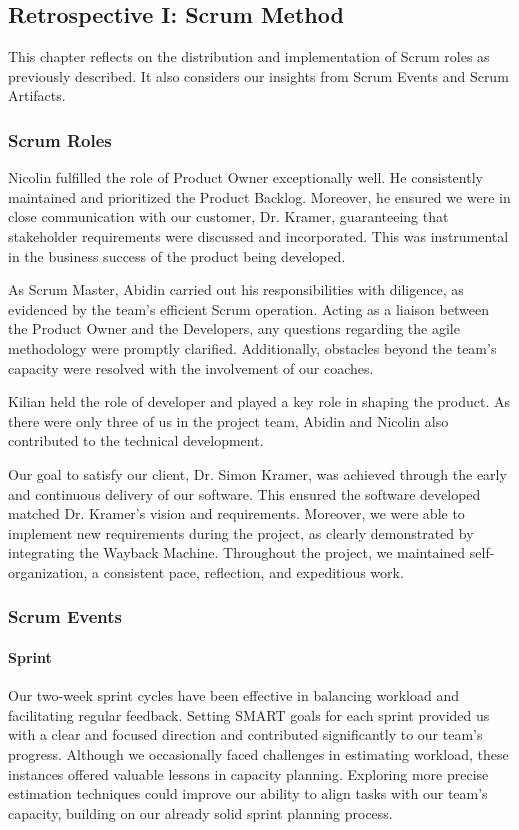 \subsection{Retrospective I: Scrum Method}
This chapter reflects on the distribution and implementation of Scrum roles as previously described.
It also considers our insights from Scrum Events and Scrum Artifacts.

\subsubsection{Scrum Roles}
Nicolin fulfilled the role of Product Owner exceptionally well.
He consistently maintained and prioritized the Product Backlog.
Moreover, he ensured we were in close communication with our customer, Dr. Kramer, guaranteeing that stakeholder requirements were discussed and incorporated.
This was instrumental in the business success of the product being developed.

As Scrum Master, Abidin carried out his responsibilities with diligence, as evidenced by the team's efficient Scrum operation.
Acting as a liaison between the Product Owner and the Developers, any questions regarding the agile methodology were promptly clarified.
Additionally, obstacles beyond the team's capacity were resolved with the involvement of our coaches.

Kilian held the role of developer and played a key role in shaping the product.
As there were only three of us in the project team, Abidin and Nicolin also contributed to the technical development.

Our goal to satisfy our client, Dr. Simon Kramer, was achieved through the early and continuous delivery of our software.
This ensured the software developed matched Dr. Kramer's vision and requirements.
Moreover, we were able to implement new requirements during the project, as clearly demonstrated by integrating the Wayback Machine.
Throughout the project, we maintained self-organization, a consistent pace, reflection, and expeditious work.

\subsubsection{Scrum Events}

\paragraph{Sprint}
Our two-week sprint cycles have been effective in balancing workload and facilitating regular feedback.
Setting SMART goals for each sprint provided us with a clear and focused direction and contributed significantly to our team's progress.
Although we occasionally faced challenges in estimating workload, these instances offered valuable lessons in capacity planning.
Exploring more precise estimation techniques could improve our ability to align tasks with our team's capacity, building on our already solid sprint planning process.

